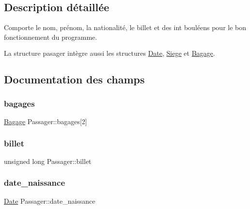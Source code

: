 \subsection{Description détaillée}
Comporte le nom, prénom, la nationalité, le billet et des int bouléens pour le bon fonctionnement du programme. 

La structure pasager intègre aussi les structures \hyperlink{structDate}{Date}, \hyperlink{structSiege}{Siege} et \hyperlink{structBagage}{Bagage}. 

\subsection{Documentation des champs}
\mbox{\label{structPassager_a46e73dd0649c0605380c7e462eae1ca5}} 
\subsubsection{\texorpdfstring{bagages}{bagages}}
{\footnotesize\ttfamily \hyperlink{structBagage}{Bagage} Passager\+::bagages\mbox{[}2\mbox{]}}

\mbox{\label{structPassager_a16af4487b4c8c88372382c2b2e29207c}} 
\subsubsection{\texorpdfstring{billet}{billet}}
{\footnotesize\ttfamily unsigned long Passager\+::billet}

\mbox{\label{structPassager_a0ddaceb5f0477dde1ddb0e5f7fa36f0e}} 
\subsubsection{\texorpdfstring{date\+\_\+naissance}{date\_naissance}}
{\footnotesize\ttfamily \hyperlink{structDate}{Date} Passager\+::date\+\_\+naissance}

\mbox{\label{structPassager_af6a1dac0de31dc6fd1bd60f728619b00}} 
